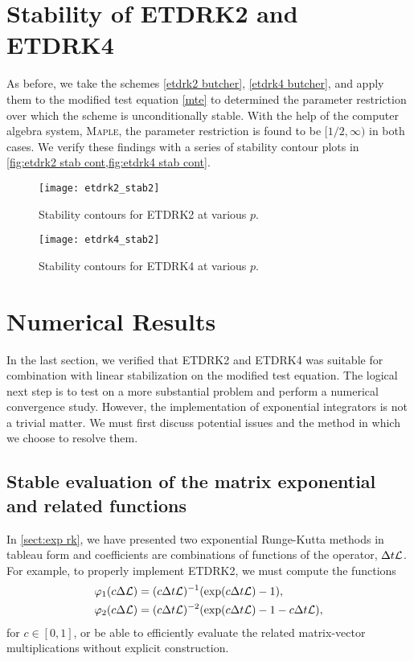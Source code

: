\section{Stability of ETDRK2 and ETDRK4}
As before, we take the schemes \cref{etdrk2 butcher}, \cref{etdrk4 butcher}, and apply them to the modified test equation \cref{mte} to determined the parameter restriction over which the scheme is unconditionally stable. With the help of the computer algebra system, \textsc{Maple}\texttrademark, the parameter restriction is found to be $[1/2,\infty)$ in both cases. We verify these findings with a series of stability contour plots in \cref{fig:etdrk2 stab cont,fig:etdrk4 stab cont}. 

\begin{figure}[htb!]
	\centering
\texttt{[image: etdrk2\_stab2]}
\caption{Stability contours for ETDRK2 at various $p$.}
\label{fig:etdrk2 stab cont}
\end{figure}

\begin{figure}[htb!]
	\centering
\texttt{[image: etdrk4\_stab2]}
\caption{Stability contours for ETDRK4 at various $p$.}
\label{fig:etdrk4 stab cont}
\end{figure}

\section{Numerical Results}
In the last section, we verified that ETDRK2 and ETDRK4 was suitable for combination with linear stabilization on the modified test equation. The logical next step is to test on a more substantial problem and perform a numerical convergence study. However, the implementation of exponential integrators is not a trivial matter. We must first discuss potential issues and the method in which we choose to resolve them.

\subsection{Stable evaluation of the matrix exponential and related functions}
In \cref{sect:exp rk}, we have presented two exponential Runge-Kutta methods in tableau form and coefficients are combinations of functions of the operator, $\Delta t\mathcal{L}$.  For example, to properly implement ETDRK2, we must compute the functions 
\begin{align}
\varphi_1(c\Delta \mathcal{L}) &= (c\Delta t \mathcal{L})^{-1}(\exp(c\Delta t \mathcal{L}) - 1),
\\
\varphi_2(c\Delta \mathcal{L}) &= (c\Delta t\mathcal{L})^{-2}(\exp(c\Delta t \mathcal{L})  -1 - c\Delta t \mathcal{L}) ,
\end{align}
for $c \in [0,1]$, or be able to efficiently evaluate the related matrix-vector multiplications without explicit construction.

